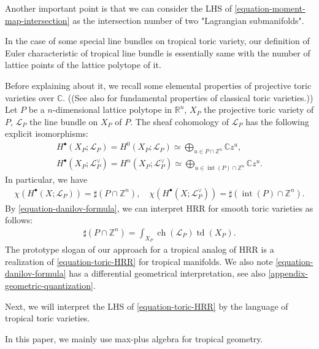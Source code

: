 \documentclass[a4paper,dvipdfmx,reqno,12pt]{amsart}
\theoremstyle{definition}
\newcommand{\opn}[1]{\operatorname{#1}}
\numberwithin{equation}{section}
\begin{document}
Another important point is that 
we can consider the LHS of 
\cref{equation-moment-map-intersection}
as the intersection number 
of two "Lagrangian submanifolds".

In the case of some special line bundles on
tropical toric variety, our definition of Euler 
characteristic of tropical line bundle is essentially same with the
number of lattice points of the lattice polytope of it.

Before explaining about it, we recall some 
elemental properties of projective toric varieties over 
$\mathbb{C}$.
((See also \cite{MR2810322} for fundamental
properties of classical toric varieties.))
Let $P$ be a $n$-dimensional lattice polytope in 
$\mathbb{R}^{n}$, $X_P$ the projective toric variety
of $P$, $\mathcal{L}_P$ the line bundle on 
$X_P$ of $P$.
The sheaf cohomology of $\mathcal{L}_P$ has 
the following explicit isomorphisms:
\begin{align}
H^{\bullet}(X_P;\mathcal{L}_P)=
H^{0}(X_P;\mathcal{L}_P)\simeq
\bigoplus_{u\in P\cap \mathbb{Z}^{n}} \mathbb{C}z^{u},
\label{equation-danilov-formula} \\
H^{\bullet}(X_P;\mathcal{L}_P^{\vee})=
H^{n}(X_P;\mathcal{L}_P^{\vee})\simeq 
\bigoplus_{u\in \opn{int}(P)\cap \mathbb{Z}^{n}}\mathbb{C}z^{u}.
\end{align}
In particular, we have
\begin{align} \label{equation-ehrhart-reciprocity}
\chi(H^{\bullet}(X;\mathcal{L}_P))=
\sharp (P\cap \mathbb{Z}^{n}), \quad 
\chi(H^{\bullet}(X;\mathcal{L}_P^{\vee}))=
\sharp (\opn{int}(P)\cap \mathbb{Z}^{n}).
\end{align}
By \cref{equation-danilov-formula}, we can interpret HRR 
for smooth toric varieties 
as follows:
\begin{align}
\label{equation-toric-HRR}
\sharp (P\cap \mathbb{Z}^{n})
=\int_{X_P}\opn{ch}(\mathcal{L}_P)\opn{td}(X_P).
\end{align}
The prototype slogan of our approach
for a tropical analog of HRR is 
a realization of \cref{equation-toric-HRR}
for tropical manifolds.
We also note \cref{equation-danilov-formula} 
has a differential geometrical interpretation,
see also \cref{appendix-geometric-quantization}. 


Next, we will interpret the LHS of 
\cref{equation-toric-HRR} by the language
of tropical toric varieties.



In this paper, we mainly use max-plus algebra for 
tropical geometry.
\end{document}
